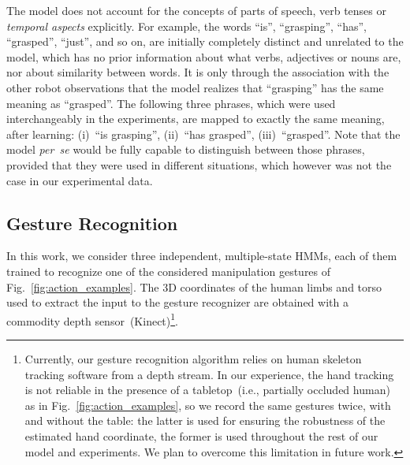 The \AffWords{} model does not account for the concepts of parts of speech, verb tenses or \emph{temporal aspects} explicitly.
For example, the words ``is'', ``grasping'', ``has'', ``grasped'', ``just'', and so on, are initially completely distinct and unrelated to the model, which has no prior information about what verbs, adjectives or nouns are, nor about similarity between words.
It is only through the association with the other robot observations that the model realizes that ``grasping'' has the same meaning as ``grasped''.
The following three phrases, which were used interchangeably in the experiments, are mapped to exactly the same meaning, after learning:
(i)~``is grasping'',
(ii)~``has grasped'',
(iii)~``grasped''.
Note that the model \emph{per~se} would be fully capable to distinguish between those phrases, provided that they were used in different situations, which however was not the case in our experimental data.

\subsection{Gesture Recognition}
\label{sec:experimental_settings:gesture_recognition}
In this work, we consider three independent, multiple-state \aclp{HMM}, each of them trained to recognize one of the considered manipulation gestures of  Fig.~\ref{fig:action_examples}.
The 3D coordinates of the human limbs and torso used to extract the input to the gesture recognizer are obtained with a commodity depth sensor~(Kinect)\footnote{Currently, our gesture recognition algorithm relies on human skeleton tracking software from a depth stream.
In our experience, the hand tracking is not reliable in the presence of a tabletop~(i.e., partially occluded human) as in Fig.~\ref{fig:action_examples}, so we record the same gestures twice, with and without the table: the latter is used for ensuring the robustness of the estimated hand coordinate, the former is used throughout the rest of our model and experiments.
We plan to overcome this limitation in future work.}.
